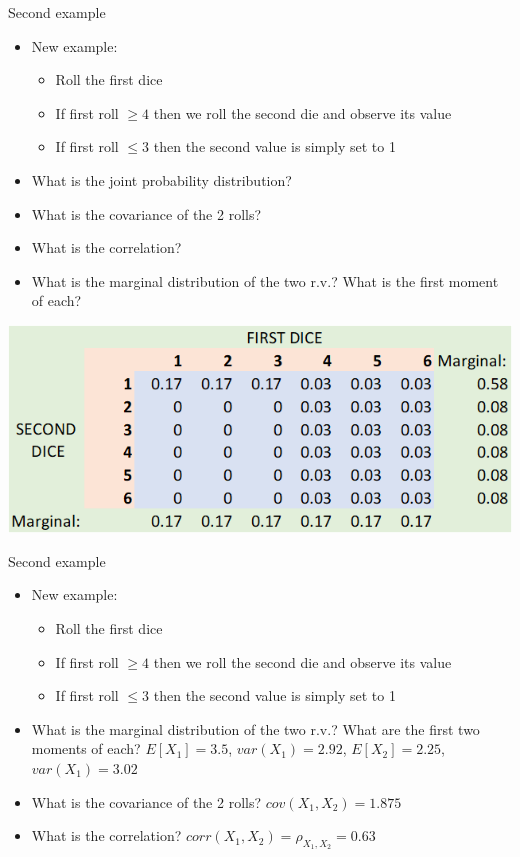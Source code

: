 \documentclass[aspectratio=169]{beamer}
\begin{document}
\begin{frame}{Second example}
    \begin{itemize}
        \item New example: 
        \begin{itemize}
            \item Roll the first dice
            \item If first roll $\geq 4$ then we roll the second die and observe its value
            \item If first roll $\leq 3$ then the second value is simply set to 1
        \end{itemize}
        \item What is the joint probability distribution?
        \item What is the covariance of the 2 rolls?
        \item What is the correlation?
        \item What is the marginal distribution of the two r.v.? What is the first moment of each?
    \end{itemize}
\end{frame}

\begin{frame}
    \centering
    \includegraphics[width = 1\textwidth,keepaspectratio]{marginal.png}
\end{frame}

\begin{frame}{Second example}
    \begin{itemize}
        \item New example: 
        \begin{itemize}
            \item Roll the first dice
            \item If first roll $\geq 4$ then we roll the second die and observe its value
            \item If first roll $\leq 3$ then the second value is simply set to 1
        \end{itemize}
        \item What is the marginal distribution of the two r.v.? What are the first two moments of each? $E[X_1] = 3.5$, $var(X_1) = 2.92$, $E[X_2] = 2.25$, $var(X_1) = 3.02$
        \item What is the covariance of the 2 rolls? $cov(X_1,X_2) = 1.875$
        \item What is the correlation? $corr(X_1,X_2) = \rho_{X_1,X_2} = 0.63$
    \end{itemize}
\end{frame}
\end{document}
